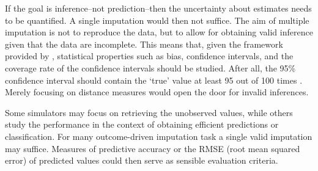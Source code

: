 \documentclass[bimj,fleqn]{w-art}
\begin{document}

If the goal is inference--not prediction--then the uncertainty about estimates needs to be quantified. A single imputation would then not suffice. The aim of multiple imputation is not to reproduce the data, but to allow for obtaining valid inference given that the data are incomplete. This means that, given the framework provided by \citet{rubi87}, statistical properties such as bias, confidence intervals, and the coverage rate of the confidence intervals should be studied. After all, the 95\% confidence interval should contain the `true' value at least 95 out of 100 times \citep[][p. 591]{neym34}. Merely focusing on distance measures would open the door for invalid inferences.

Some simulators may focus on retrieving the unobserved values, while others study the performance in the context of obtaining efficient predictions or classification. For many outcome-driven imputation task a single valid imputation may suffice. Measures of predictive accuracy or the RMSE (root mean squared error) of predicted values could then serve as sensible evaluation criteria.



\end{document}
